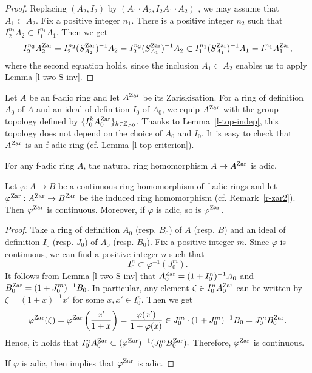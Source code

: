\begin{proof}
Replacing $(A_2, I_2)$ by $(A_1 \cdot A_2, I_2A_1 \cdot A_2)$ \cite[Corollary 1.3(i)]{Hub93}, 
we may assume that $A_1 \subset A_2$. 
Fix a positive integer $n_1$. 
There is a positive integer $n_2$ such that $I_2^{n_2}A_2 \subset I_1^{n_1}A_1$. 
Then we get 
$$I_2^{n_2}A_2^{{\operatorname{Zar}}}=I_2^{n_2}(S^{{\operatorname{Zar}}}_{A_2})^{-1}A_2=I_2^{n_2}(S^{{\operatorname{Zar}}}_{A_1})^{-1}A_2 \subset I_1^{n_1}(S^{{\operatorname{Zar}}}_{A_1})^{-1}A_1=I_1^{n_1}A_1^{{\operatorname{Zar}}},$$
where the second equation holds, 
since the inclusion $A_1 \subset A_2$ enables us to apply Lemma \ref{l-two-S-inv}. \end{proof}


\begin{dfn}\label{d-zar-top}
Let $A$ be an f-adic ring and let $A^{{\operatorname{Zar}}}$ be its Zariskisation. 
For a ring of definition $A_0$ of $A$ and 
an ideal of definition $I_0$ of $A_0$, 
we equip $A^{{\operatorname{Zar}}}$ with the group topology 
defined by $\{I_0^kA_0^{{\operatorname{Zar}}}\}_{k\in \mathbb{Z}_{>0}}$. 
Thanks to Lemma~\ref{l-top-indep}, 
this topology does not depend on the choice of $A_0$ and $I_0$. 
It is easy to check that $A^{{\operatorname{Zar}}}$ is an f-adic ring (cf. Lemma \ref{l-top-criterion}). 
\end{dfn}



\begin{rem}\label{r-zar-adic}
For any f-adic ring $A$, the natural ring homomorphism $A \to A^{{\operatorname{Zar}}}$ is adic. 
\end{rem}

\begin{lem}\label{l-zar-cont}
Let $\varphi:A \to B$ be a continuous ring homomorphism of f-adic rings and 
let $\varphi^{{\operatorname{Zar}}}:A^{{\operatorname{Zar}}} \to B^{{\operatorname{Zar}}}$ be the induced ring homomorphism 
(cf. Remark~\ref{r-zar2}). 
Then $\varphi^{{\operatorname{Zar}}}$ is continuous. 
Moreover, if $\varphi$ is adic, so is $\varphi^{{\operatorname{Zar}}}$. 
\end{lem}

\begin{proof}
Take a ring of definition $A_0$ (resp. $B_0$) of $A$ (resp. $B$) 
and an ideal of definition $I_0$ (resp. $J_0$) of $A_0$ (resp. $B_0$). 
Fix a positive integer $m$. 
Since $\varphi$ is continuous, we can find a positive integer $n$ such that 
$$I_0^n \subset \varphi^{-1}(J_0^m).$$
It follows from Lemma \ref{l-two-S-inv} that 
$A_0^{{\operatorname{Zar}}}=(1+I_0^n)^{-1}A_0$ and $B_0^{{\operatorname{Zar}}}=(1+J_0^m)^{-1}B_0$. 
In particular, any element $\zeta \in I_0^nA_0^{{\operatorname{Zar}}}$ can be written 
by $\zeta=(1+x)^{-1}x'$ for some $x, x' \in I_0^n$. 
Then we get 
\[
\varphi^{{\operatorname{Zar}}}(\zeta)=\varphi^{{\operatorname{Zar}}}\left(\frac{x'}{1+x} \right)=\frac{\varphi(x')}{1+\varphi(x)}
\in J_0^m\cdot (1+J_0^m)^{-1}B_0= J_0^mB_0^{{\operatorname{Zar}}}.
\]
Hence, it holds that $I_0^nA^{{\operatorname{Zar}}}_0 \subset (\varphi^{{\operatorname{Zar}}})^{-1}(J_0^mB^{{\operatorname{Zar}}}_0).$ 
Therefore, $\varphi^{{\operatorname{Zar}}}$ is continuous. 

If $\varphi$ is adic, then \cite[Corollary 1.9(ii)]{Hub93} 
implies that $\varphi^{{\operatorname{Zar}}}$ is adic. 
\end{proof}


